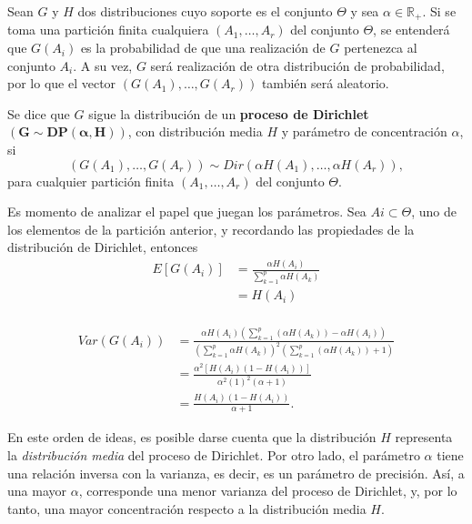 \begin{defin}
    Sean $G$ y $H$ dos distribuciones cuyo soporte es el conjunto $\Theta$ y sea $\alpha \in \mathbb{R}_+$. Si se toma una partici\'on finita cualquiera $(A_1,\ldots,A_r)$ del conjunto $\Theta$, se entender\'a que $G(A_i)$ es la probabilidad de que una realizaci\'on de $G$ pertenezca al conjunto $A_i$.
    A su vez, $G$ ser\'a realizaci\'on de otra distribuci\'on de probabilidad, por lo que el vector $(G(A_1),\ldots,G(A_r))$ tambi\'en ser\'a aleatorio.
    
    Se dice que $G$ sigue la distribuci\'on de un \textbf{proceso de Dirichlet} $\bm{(G \sim DP(\alpha,H))}$, con distribuci\'on media $H$ y par\'ametro de concentraci\'on $\alpha$, si
    \begin{equation*}
        (G(A_1),\ldots,G(A_r)) \sim Dir(\alpha H(A_1),\ldots,\alpha H(A_r)), 
    \end{equation*}
    para cualquier partici\'on finita $(A_1,\ldots,A_r)$ del conjunto $\Theta$.
\end{defin}

Es momento de analizar el papel que juegan los par\'ametros. Sea $Ai \subset \Theta$, uno de los elementos de la partici\'on anterior, y recordando las propiedades de la distribuci\'on de Dirichlet, entonces
\begin{equation*}
\begin{aligned}
    E[G(A_i)] 
    &= \frac{\alpha H(A_i)}{\sum_{k=1}^p \alpha H(A_k)} \\
    &= H(A_i) \\
\end{aligned}
\end{equation*}

\begin{equation*}
\begin{aligned}
    Var(G(A_i)) 
    &= \frac{\alpha H(A_i)\left(\sum_{k=1}^p(\alpha H(A_k)) - \alpha H(A_i)\right)}
       {\left(\sum_{k=1}^p \alpha H(A_k)\right)^2\left(\sum_{k=1}^p(\alpha H(A_k)) + 1\right)} \\
    &= \frac{\alpha^2 [H(A_i)(1 - H(A_i))]}
       {\alpha^2 (1)^2(\alpha + 1)} \\
    &= \frac{H(A_i)(1 - H(A_i))}
       {\alpha + 1}.
\end{aligned}
\end{equation*}

En este orden de ideas, es posible darse cuenta que la distribuci\'on $H$ representa la \textit{distribuci\'on media} del proceso de Dirichlet. Por otro lado, el par\'ametro $\alpha$ tiene una relaci\'on inversa con la varianza, es decir, es un par\'ametro de precisi\'on. As\'i, a una mayor $\alpha$, corresponde una menor varianza del proceso de Dirichlet, y, por lo tanto, una mayor concentraci\'on respecto a la distribuci\'on media $H$. 

